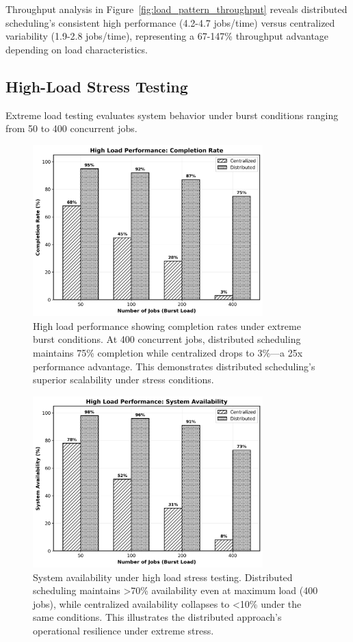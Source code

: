 \documentclass[conference]{IEEEtran}
\begin{document}
Throughput analysis in Figure~\ref{fig:load_pattern_throughput} reveals distributed scheduling's consistent high performance (4.2-4.7 jobs/time) versus centralized variability (1.9-2.8 jobs/time), representing a 67-147\% throughput advantage depending on load characteristics.

\subsection{High-Load Stress Testing}

Extreme load testing evaluates system behavior under burst conditions ranging from 50 to 400 concurrent jobs.

\begin{figure}[!t]
\centering
\includegraphics[width=3.5in]{figure9_high_load_completion.png}
\caption{High load performance showing completion rates under extreme burst conditions. At 400 concurrent jobs, distributed scheduling maintains 75\% completion while centralized drops to 3\%—a 25x performance advantage. This demonstrates distributed scheduling's superior scalability under stress conditions.}
\label{fig:high_load_completion}
\end{figure}

\begin{figure}[!t]
\centering
\includegraphics[width=3.5in]{figure10_high_load_availability.png}
\caption{System availability under high load stress testing. Distributed scheduling maintains >70\% availability even at maximum load (400 jobs), while centralized availability collapses to <10\% under the same conditions. This illustrates the distributed approach's operational resilience under extreme stress.}
\label{fig:high_load_availability}
\end{figure}
\end{document}
